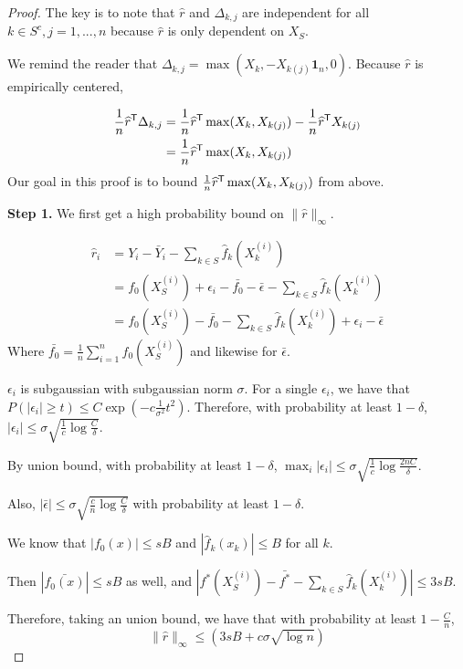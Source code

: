 \begin{proof}
The key is to note that $\hat{r}$ and $\Delta_{k,j}$ are independent for all $k \in S^c,j=1,...,n$ because $\hat{r}$ is only dependent on $X_{S}$.

We remind the reader that $\Delta_{k,j} = \max(X_k, - X_{k(j)} \mathbf{1}_n, 0)$. Because $\hat{r}$ is empirically centered,

\begin{align*}
\frac{1}{n} \widehat{r}^{\mathsf{T}} \Delta_{k,j} &= \frac{1}{n} \widehat{r}^{\mathsf{T}} \max(X_k, X_{k(j)}) 
                                            - \frac{1}{n} \widehat{r}^{\mathsf{T}} X_{k(j)} \\
                  &= \frac{1}{n} \widehat{r}^{\mathsf{T}} \max(X_k, X_{k(j)})
\end{align*}
Our goal in this proof is to bound $\frac{1}{n} \widehat{r}^{\mathsf{T}} \max(X_k, X_{k(j)})$ from above.

\textbf{Step 1.} We first get a high probability bound on $\| \hat{r} \|_\infty$. 

\begin{align*}
\hat{r}_i &= Y_i - \bar{Y}_i -  \sum_{k \in S} \hat{f}_k (X_k^{(i)}) \\
	&= f_0(X_S^{(i)}) + \epsilon_i - \bar{f_0} - \bar{\epsilon}- \sum_{k \in S} \hat{f}_k(X_k^{(i)}) \\
	&=  f_0(X_S^{(i)}) - \bar{f_0} - \sum_{k \in S} \hat{f}_k(X_k^{(i)}) + \epsilon_i - \bar{\epsilon}
\end{align*}
Where $\bar{f_0} = \frac{1}{n} \sum_{i=1}^n f_0(X_S^{(i)})$ and likewise for $\bar{\epsilon}$.

$\epsilon_i$ is subgaussian with subgaussian norm $\sigma$. For a single $\epsilon_i$, we have that $P( |\epsilon_i| \geq t ) \leq C \exp( - c \frac{1}{\sigma^2} t^2)$. Therefore, with probability at least $1-\delta$, $|\epsilon_i| \leq \sigma\sqrt{ \frac{1}{c} \log \frac{C}{\delta}}$. 

By union bound, with probability at least $1-\delta$, $\max_i |\epsilon_i| \leq \sigma \sqrt{ \frac{1}{c} \log \frac{2nC}{\delta}}$.

Also, $|\bar{\epsilon}| \leq \sigma \sqrt{\frac{c}{n} \log \frac{C}{\delta}}$ with probability at least $1 - \delta$.

We know that $|f_0(x)| \leq sB$ and $|\hat{f}_k(x_k)| \leq B$ for all $k$. 

Then $|\bar{f_0(x)}| \leq sB$ as well, and $|f^*(X_S^{(i)}) - \bar{f^*} - \sum_{k \in S} \hat{f}_k(X_k^{(i)})| \leq 3s B$.

Therefore, taking an union bound, we have that with probability at least $1-\frac{C}{n}$, 
\[
\| \hat{r} \|_\infty \leq (3 s B + c\sigma\sqrt{\log n}) 
\]



\end{proof}
